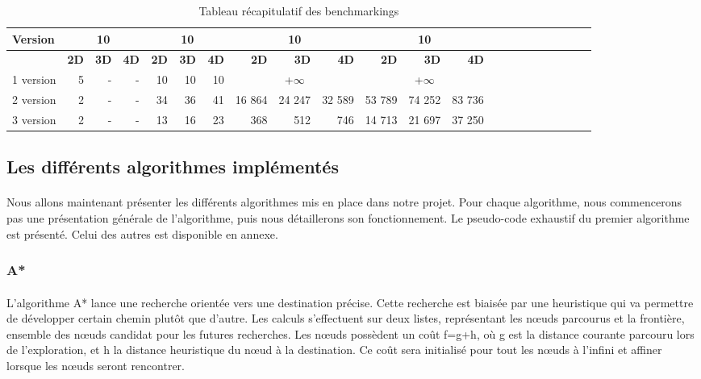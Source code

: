 \documentclass[pidr]{tnreport}
\begin{document}
\begin{table}[h]
\begin{center}
   \begin{tabular}{| l | r | r | r | r | r | r | r | r | r | r | r | r | r | r | r | r | r | r | r | r | r |}
     \hline
      \textbf{Version} & \multicolumn{3}{c|}{\textbf{10\up{2}}} & \multicolumn{3}{c|}{\textbf{10\up{4}}} & \multicolumn{3}{c|}{\textbf{10\up{6}}} & \multicolumn{3}{c|}{\textbf{10\up{7}}} \\
     \hline
     \cline{2-5}
    & \textbf{2D} & \textbf{3D} & \textbf{4D} & \textbf{2D} & \textbf{3D} & \textbf{4D} & \textbf{2D} & \textbf{3D} & \textbf{4D} & \textbf{2D} & \textbf{3D} & \textbf{4D}\\ \hline
     1\up{ère} version & 5 & - & - & ~10\up{7} & ~10\up{8} & ~10\up{8} & \multicolumn{3}{c|}{+$\infty$}  & \multicolumn{3}{c|}{+$\infty$}   \\ \hline
     2\up{ème} version & 2 & - & - & 34 & 36 & 41 & 16 864 & 24 247 & 32 589 & 53 789 & 74 252 & 83 736  \\ \hline
     3\up{ème} version & 2 & - & - & 13 & 16 & 23 & 368 & 512 & 746  & 14 713 & 21 697 & 37 250 \\ \hline
   \end{tabular}
 \end{center}
 \caption{Tableau récapitulatif des benchmarkings}
\end{table}

	\subsection{Les différents algorithmes implémentés}

\paragraph{}
Nous allons maintenant présenter les différents algorithmes mis en place dans notre projet. Pour chaque algorithme, nous commencerons pas une présentation générale de l'algorithme, puis nous détaillerons son fonctionnement. Le pseudo-code exhaustif du premier algorithme est présenté. Celui des autres est disponible en annexe.
	
\subsubsection{A*}	
\paragraph{}
L'algorithme A* lance une recherche orientée vers une destination précise. Cette recherche est biaisée par une heuristique qui va permettre de développer certain chemin plutôt que d'autre. Les calculs s'effectuent sur deux listes, représentant les nœuds parcourus et la frontière, ensemble des nœuds candidat pour les futures recherches. Les nœuds possèdent un coût f=g+h, où g est la distance courante parcouru lors de l'exploration, et h la distance heuristique du nœud à la destination. Ce coût sera initialisé pour tout les nœuds à l'infini et affiner lorsque les nœuds seront rencontrer. 
\end{document}
